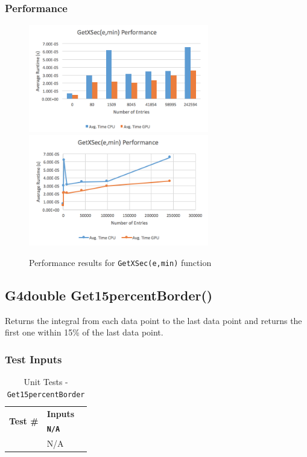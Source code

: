 \documentclass[12pt]{article}
\newcounter{TestCounter}
\begin{document}
	\subsubsection{Performance}
		\begin{figure}[H]
    	\centering
    	\caption{Performance results for \texttt{GetXSec(e,min)} function}\label{figPerformanceGetXSec_e_min}
    	\includegraphics[width=0.7\textwidth]{getxsec_e_min_bar.png}
    	\includegraphics[width=0.7\textwidth]{getxsec_e_min_line.png}
    	\end{figure}

\subsection{G4double Get15percentBorder()}
	
	 Returns the integral from each data point to the last data point and returns the first one within 
15\% of the last data point.
	
	\subsubsection{Test Inputs}
		\begin{table}[H]
		\centering
		\caption{Unit Tests - \texttt{Get15percentBorder}}\label{Get15percentBorder_unit}
		\begin{tabular}{lll}
		\toprule
		\multirow{2}{*}{\bf Test \#}  & \multicolumn{1}{c}{\bf Inputs}\\
		& \bf \texttt{N/A}\\\midrule
		{TestCounter}\arabic{TestCounter}\label{Get15percentBorder_0} & N/A \\
		\bottomrule
		\end{tabular}
		\end{table}
	
\end{document}
